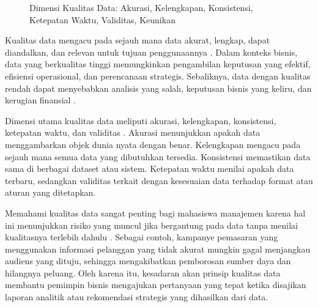 \begin{figure}[h]
	\centering
	\caption{Dimensi Kualitas Data: Akurasi, Kelengkapan, Konsistensi, Ketepatan Waktu, Validitas, Keunikan}
	\label{fig:dimensi-kualitas-data}
\end{figure}





Kualitas data mengacu pada sejauh mana data akurat, lengkap, dapat diandalkan, dan relevan untuk tujuan penggunaannya \cite{wang1996beyond}. Dalam konteks bisnis, data yang berkualitas tinggi memungkinkan pengambilan keputusan yang efektif, efisiensi operasional, dan perencanaan strategis. Sebaliknya, data dengan kualitas rendah dapat menyebabkan analisis yang salah, keputusan bisnis yang keliru, dan kerugian finansial \cite{redman1998impact}.

Dimensi utama kualitas data meliputi akurasi, kelengkapan, konsistensi, ketepatan waktu, dan validitas \cite{pipino2002data}. Akurasi menunjukkan apakah data menggambarkan objek dunia nyata dengan benar. Kelengkapan mengacu pada sejauh mana semua data yang dibutuhkan tersedia. Konsistensi memastikan data sama di berbagai dataset atau sistem. Ketepatan waktu menilai apakah data terbaru, sedangkan validitas terkait dengan kesesuaian data terhadap format atau aturan yang ditetapkan.

Memahami kualitas data sangat penting bagi mahasiswa manajemen karena hal ini menunjukkan risiko yang muncul jika bergantung pada data tanpa menilai kualitasnya terlebih dahulu \cite{strong1997data}. Sebagai contoh, kampanye pemasaran yang menggunakan informasi pelanggan yang tidak akurat mungkin gagal menjangkau audiens yang dituju, sehingga mengakibatkan pemborosan sumber daya dan hilangnya peluang. Oleh karena itu, kesadaran akan prinsip kualitas data membantu pemimpin bisnis mengajukan pertanyaan yang tepat ketika disajikan laporan analitik atau rekomendasi strategis yang dihasilkan dari data.

